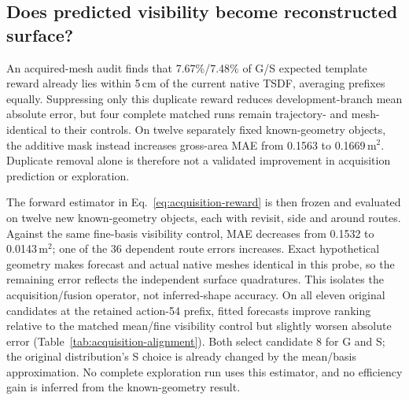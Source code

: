 \subsection{Does predicted visibility become reconstructed surface?}
An acquired-mesh audit finds that 7.67\%/7.48\% of G/S expected template reward already lies within 5\,cm of the current native TSDF, averaging prefixes equally. Suppressing only this duplicate reward reduces development-branch mean absolute error, but four complete matched runs remain trajectory- and mesh-identical to their controls. On twelve separately fixed known-geometry objects, the additive mask instead increases gross-area MAE from 0.1563 to 0.1669\,m$^2$. Duplicate removal alone is therefore not a validated improvement in acquisition prediction or exploration.

The forward estimator in Eq.~\ref{eq:acquisition-reward} is then frozen and evaluated on twelve new known-geometry objects, each with revisit, side and around routes. Against the same fine-basis visibility control, MAE decreases from 0.1532 to 0.0143\,m$^2$; one of the 36 dependent route errors increases. Exact hypothetical geometry makes forecast and actual native meshes identical in this probe, so the remaining error reflects the independent surface quadratures. This isolates the acquisition/fusion operator, not inferred-shape accuracy. On all eleven original candidates at the retained action-54 prefix, fitted forecasts improve ranking relative to the matched mean/fine visibility control but slightly worsen absolute error (Table~\ref{tab:acquisition-alignment}). Both select candidate 8 for G and S; the original distribution's S choice is already changed by the mean/basis approximation. No complete exploration run uses this estimator, and no efficiency gain is inferred from the known-geometry result.


